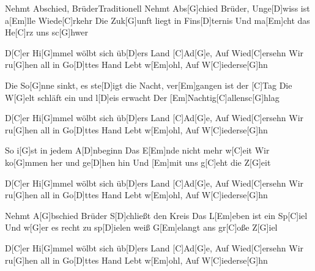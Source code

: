 \documentclass[../main.tex]{subfiles}
\begin{document}
\begin{song}{Nehmt Abschied, Brüder}{Traditionell}{}
Nehmt Abs[G]chied Brüder,
Unge[D]wiss ist a[Em]lle Wiede[C]rkehr
Die Zuk[G]unft liegt in Fins[D]ternis
Und ma[Em]cht das He[C]rz uns sc[G]hwer

D[C]er Hi[G]mmel wölbt sich üb[D]ers Land
[C]Ad[G]e, Auf Wied[C]ersehn
Wir ru[G]hen all in Go[D]ttes Hand
Lebt w[Em]ohl, Auf W[C]iederse[G]hn

Die So[G]nne sinkt,
es ste[D]igt die Nacht, ver[Em]gangen ist der [C]Tag
Die W[G]elt schläft ein und l[D]eis erwacht
Der [Em]Nachtig[C]allensc[G]hlag

D[C]er Hi[G]mmel wölbt sich üb[D]ers Land
[C]Ad[G]e, Auf Wied[C]ersehn
Wir ru[G]hen all in Go[D]ttes Hand
Lebt w[Em]ohl, Auf W[C]iederse[G]hn

So i[G]st in jedem A[D]nbeginn
Das E[Em]nde nicht mehr w[C]eit
Wir ko[G]mmen her und ge[D]hen hin
Und [Em]mit uns g[C]eht die Z[G]eit

D[C]er Hi[G]mmel wölbt sich üb[D]ers Land
[C]Ad[G]e, Auf Wied[C]ersehn
Wir ru[G]hen all in Go[D]ttes Hand
Lebt w[Em]ohl, Auf W[C]iederse[G]hn

Nehmt A[G]bschied Brüder
S[D]chließt den Kreis
Das L[Em]eben ist ein Sp[C]iel
Und w[G]er es recht zu sp[D]ielen weiß
G[Em]elangt ans gr[C]oße Z[G]iel

D[C]er Hi[G]mmel wölbt sich üb[D]ers Land
[C]Ad[G]e, Auf Wied[C]ersehn
Wir ru[G]hen all in Go[D]ttes Hand
Lebt w[Em]ohl, Auf W[C]iederse[G]hn
\end{song}
\end{document}
